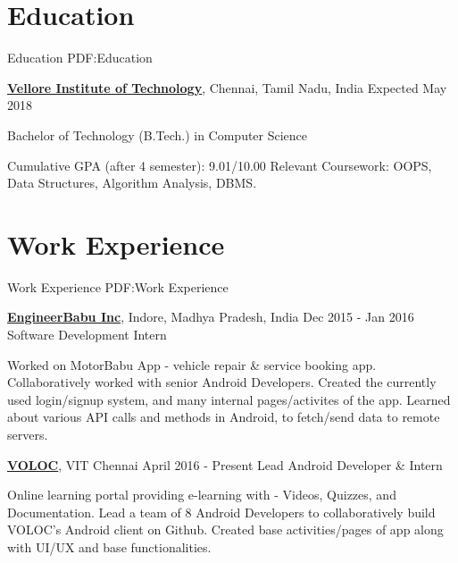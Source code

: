 \documentclass[letterpaper,10pt,oneside]{article}
\begin{document}
\begin{body}


\section
{Education}
{Education}
{PDF:Education}

\href{http://vit.ac.in/}
{\textbf{Vellore Institute of Technology}},
Chennai, Tamil Nadu, India
\hfill
{Expected May 2018}

\GapNoBreak
\BulletItem
Bachelor of Technology (B.Tech.) in Computer Science
\begin{detail}
\SubBulletItem
Cumulative GPA (after 4 semester): 9.01/10.00
\SubBulletItem
Relevant Coursework: OOPS, Data Structures, Algorithm Analysis, DBMS.
\end{detail}



\section
{Work Experience}
{Work Experience}
{PDF:Work Experience}

\href{https://www.engineerbabu.com/}
{\textbf{EngineerBabu Inc}},
Indore, Madhya Pradesh, India
\hfill
{Dec 2015 - Jan 2016}
\GapNoBreak
\BulletItem
Software Development Intern
\begin{detail}
\SubBulletItem
Worked on MotorBabu App - vehicle repair \& service booking app. 
\SubBulletItem
Collaboratively worked with senior Android Developers. 
\SubBulletItem
Created the currently used login/signup system, and many internal pages/activites of the app.
\SubBulletItem
Learned about various API calls and methods in Android, to fetch/send data to remote servers.
\end{detail}

\Gap
\href{}
{\textbf{VOLOC}}, VIT Chennai
\hfill
{April 2016 - Present}
\GapNoBreak
\BulletItem
Lead Android Developer \& Intern
\begin{detail}
\SubBulletItem
Online learning portal providing e-learning with - Videos, Quizzes, and Documentation.
\SubBulletItem
Lead a team of 8 Android Developers to collaboratively build VOLOC's Android client on Github.
\SubBulletItem
Created base activities/pages of app along with UI/UX and base functionalities.
\end{detail}



\end{body}
\end{document}
